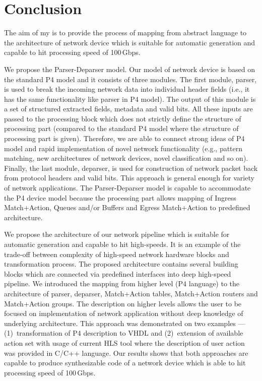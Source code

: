\chapter{Conclusion}
\label{chap:conclusion}
The aim of my \thesis{} is to provide the process of mapping from abstract language to the architecture of network device which is 
suitable for automatic generation and capable to hit processing speed of 100\,Gbps.

We propose the Parser-Deparser model. Our model of network device is based on the standard P4 model and it consists of three modules. 
The first module, parser, is used to break the incoming network data into individual header fields
(i.e., it has the same functionality like parser in P4 model).
The output of this module is a set of structured extracted fields, metadata and valid bits. All these inputs are passed
to the processing block which does not strictly define the structure of processing part 
(compared to the standard P4 model where the structure of processing part is given). 
Therefore, we are able to connect strong ideas of P4 model and rapid implementation of novel network functionality 
(e.g., pattern matching, new architectures of network devices, novel classification and so on). 
Finally, the last module, deparser, is used for construction of network packet back from protocol headers and valid bits.
This approach is general enough for variety of network applications. 
The Parser-Deparser model is capable to accommodate the P4 device model 
because the processing part allows mapping of Ingress Match+Action, Queues and/or Buffers and Egress Match+Action 
to predefined architecture.

We propose the architecture of our network pipeline which is suitable for automatic generation and capable to hit high-speeds. 
It is an example of the trade-off between complexity of high-speed network hardware blocks and transformation process. 
The proposed architecture contains several building blocks which are connected via predefined interfaces into deep high-speed pipeline.
We introduced the mapping from higher level (P4 language) to the architecture of parser, deparser, Match+Action tables,
Match+Action routers and Match+Action groups. The description on higher levels allows the user to be focused on implementation of 
network application without deep knowledge of underlying architecture. This approach was demonstrated on two examples --- 
(1)~transformation of P4 description to VHDL and (2)~extension of available action set with usage of current HLS tool where the
description of user action was provided in C/C++ language.
Our results shows that both approaches are capable to produce synthesizable code of a network device 
which is able to hit processing speed of 100\,Gbps.

